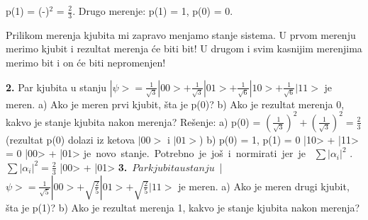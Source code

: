 \documentclass{article}
\begin{document}
p(1) = (-)$^2$ = $\frac{2}{3}$. Drugo merenje: p(1) = 1, p(0) = 0.


\begin{tcolorbox}[width=\textwidth,colback={beaublue},outer arc=0mm,colupper=charcoal]   

Prilikom merenja kjubita mi zapravo menjamo stanje sistema. U prvom merenju merimo kjubit i rezultat merenja će biti bit! U drugom i svim kasnijim merenjima merimo bit i on će biti nepromenjen!
\end{tcolorbox}  



\vspace{0.4cm}\newline
\textbf{2.} Par kjubita u stanju $|\psi> = \frac{1}{\sqrt{3}}|00> + \frac{1}{\sqrt{3}}|01> + \frac{1}{\sqrt{6}}|10> + \frac{1}{\sqrt{6}}|11>$ je meren. \newline
a) Ako je meren prvi kjubit, šta je p(0)?\newline
b) Ako je rezultat merenja 0, kakvo je stanje kjubita nakon merenja?
\vspace{0.4cm}\newline
Rešenje: \vspace{0.2cm}\newline
a) p(0) = $(\frac{1}{\sqrt{3}})^2 + (\frac{1}{\sqrt{3}})^2 = \frac{2}{3}$ (rezultat p(0) dolazi iz ketova $|00>$ i $|01>$) \newline 
b) p(0) = 1, p(1) = 0 \longrightarrow {}|10> + |11> = 0\newline
\hspace*{0.4cm}\Rightarrow {}|00> + |01> je\ novo\ stanje.\ Potrebno\ je\ još\ i\ normirati\ jer\ je\ \newline
\hspace*{0.4cm}$\sum|\alpha_i|^2$ .\ $\sum|\alpha_i|^2 = \frac{2}{3}$ \Rightarrow
{}|00> + |01>
\vspace{0.4cm}\newline
\textbf{3.}\ $Par kjubita u stanju$\ |$\psi> = \frac{1}{\sqrt{5}}|00> + \sqrt{\frac{2}{5}}|01> + \sqrt{\frac{2}{5}}|11>$ je meren. \newline
a) Ako je meren drugi kjubit, šta je p(1)?\newline
b) Ako je rezultat merenja 1, kakvo je stanje kjubita nakon merenja?
\vspace*{0.4cm}\newline
\end{document}

